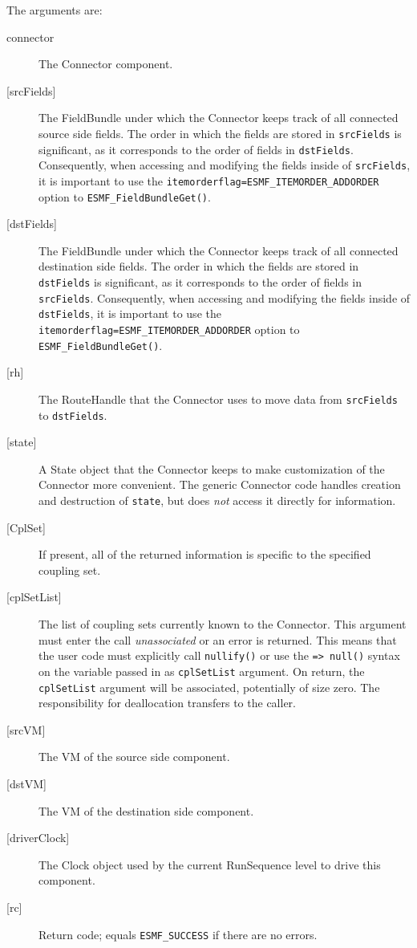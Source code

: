      The arguments are:
     \begin{description}
     \item[connector]
       The Connector component.
     \item[{[srcFields]}]
       The FieldBundle under which the Connector keeps track of all connected
       source side fields. The order in which the fields are stored
       in {\tt srcFields} is significant, as it corresponds to the order of
       fields in {\tt dstFields}. Consequently, when accessing and modifying
       the fields inside of {\tt srcFields}, it is important to use the
       {\tt itemorderflag=ESMF\_ITEMORDER\_ADDORDER} option to
       {\tt ESMF\_FieldBundleGet()}.
     \item[{[dstFields]}]
       The FieldBundle under which the Connector keeps track of all connected
       destination side fields. The order in which the fields are stored
       in {\tt dstFields} is significant, as it corresponds to the order of
       fields in {\tt srcFields}. Consequently, when accessing and modifying
       the fields inside of {\tt dstFields}, it is important to use the
       {\tt itemorderflag=ESMF\_ITEMORDER\_ADDORDER} option to
       {\tt ESMF\_FieldBundleGet()}.
     \item[{[rh]}]
       The RouteHandle that the Connector uses to move data from {\tt srcFields}
       to {\tt dstFields}.
     \item[{[state]}]
       A State object that the Connector keeps to make customization of the 
       Connector more convenient. The generic Connector code handles creation
       and destruction of {\tt state}, but does {\em not} access it directly 
       for information.
     \item[{[CplSet]}]
       If present, all of the returned information is specific to the specified
       coupling set.
     \item[{[cplSetList]}]
       The list of coupling sets currently known to the Connector. This argument
       must enter the call {\em unassociated} or an error is returned. This means
       that the user code must explicitly call {\tt nullify()} or use the
       {\tt => null()} syntax on the variable passed in as {\tt cplSetList}
       argument. On return, the {\tt cplSetList} argument will be associated, 
       potentially of size zero. The responsibility for deallocation transfers
       to the caller.
     \item[{[srcVM]}]
       The VM of the source side component.
     \item[{[dstVM]}]
       The VM of the destination side component.
     \item[{[driverClock]}]
       The Clock object used by the current RunSequence level to drive this
       component.
     \item[{[rc]}]
       Return code; equals {\tt ESMF\_SUCCESS} if there are no errors.
     \end{description}
   
